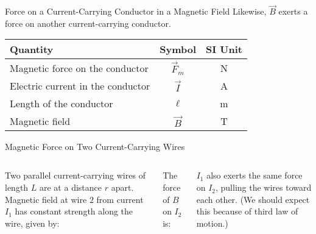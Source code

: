 \documentclass[12pt,aspectratio=169]{beamer}
\begin{document}
\begin{frame}{Force on a Current-Carrying Conductor in a Magnetic Field}
  Likewise, $\vec B$ exerts a force on another current-carrying conductor.

  \begin{center}
    \begin{tabular}{l|c|c}
      \rowcolor{pink}
      \textbf{Quantity} & \textbf{Symbol} & \textbf{SI Unit} \\ \hline
      Magnetic force on the conductor   & $\vec F_m$ & \si\newton \\
      Electric current in the conductor & $\vec I$   & \si\ampere \\
      Length of the conductor           & $\ell$     & \si\metre \\
      Magnetic field                    & $\vec B$   & \si\tesla
    \end{tabular}
  \end{center}
\end{frame}



\begin{frame}{Magnetic Force on Two Current-Carrying Wires}
  \begin{columns}

    Two parallel current-carrying wires of length $L$ are at a distance $r$
    apart. Magnetic field at wire $2$ from current $I_1$ has constant strength
    along the wire, given by:


    The force of $B$ on $I_2$ is:


    \vspace{-.1in}$I_1$ also exerts the same force on $I_2$, pulling the wires
    toward each other. (We should expect this because of third law of motion.)
  \end{columns}
\end{frame}
\end{document}
